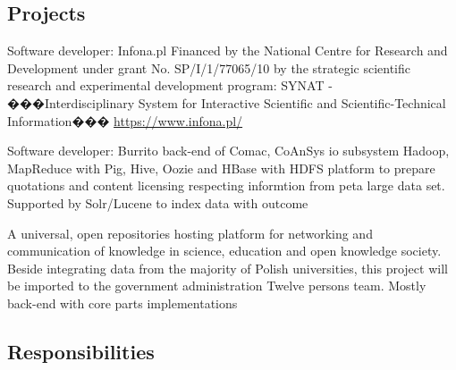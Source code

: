 %
%
%
%



\subsection{Projects}

{Software developer: Infona.pl}
{Financed by the National Centre for Research and Development under grant
 No. SP/I/1/77065/10 by the strategic scientific research and experimental
  development program: SYNAT - ���Interdisciplinary System for Interactive
   Scientific and Scientific-Technical Information���}
 {}{}{\href{https://www.infona.pl/}{https://www.infona.pl/}}

{Software developer: Burrito back-end of Comac,
CoAnSys io subsystem} {Hadoop, MapReduce with Pig, Hive, Oozie and HBase with
HDFS platform to prepare quotations and content licensing respecting
informtion from peta large data set. Supported by Solr/Lucene to index data with
 outcome}
 {}{}
 {
 }
 
 {A universal, open repositories hosting platform for networking and communication 
 of knowledge in science, education and open knowledge society. Beside integrating
  data from the majority of Polish universities, this project will be imported to
   the government administration}
 {Twelve persons team. Mostly back-end with core parts implementations}
 {}
 {
 }



\subsection{Responsibilities}


